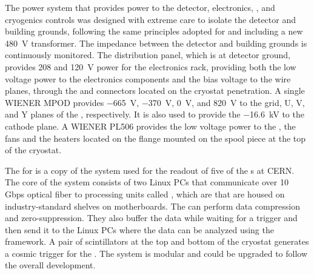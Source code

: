 The  power system that provides power to the detector, electronics, 
, and cryogenics controls was designed with extreme care to 
isolate the detector and building grounds, following the same principles adopted
for  and including a new \SI{480}{V} transformer. The impedance between the detector
and building grounds is continuously monitored. The distribution panel, which is 
at detector ground, provides 208 and \SI{120}{V} power for the  electronics rack, 
providing both the low voltage power to the  electronics components and the bias 
voltage to the  wire planes, through the  and 
connectors located on the cryostat penetration. A single WIENER MPOD provides 
\SI{-665}{V}, \SI{-370}{V}, \SI{0}{V}, and \SI{820}{V} to the grid, U, V, and 
Y planes of the , respectively. It is also used to provide the 
\SI{-16.6}{kV} to the cathode plane. A WIENER PL506 provides the low voltage
power to the , the fans and the heaters located on the 
flange mounted on the spool piece at the top of the cryostat. 

The  for  is a copy of the system used for the readout
of five of the  s at CERN. The core of the  system 
consists of two Linux PCs that communicate over 10 Gbps optical fiber
to processing units called , which are  that are
housed on industry-standard  shelves on  motherboards.
The  can perform data compression and zero-suppression. They also buffer
the data while waiting for a trigger and then send it to the Linux PCs where the data can
be analyzed using the  framework. A pair of scintillators at the top and
bottom of the cryostat generates a cosmic trigger for the .
The system is modular and could be upgraded to follow the overall   
development. 

